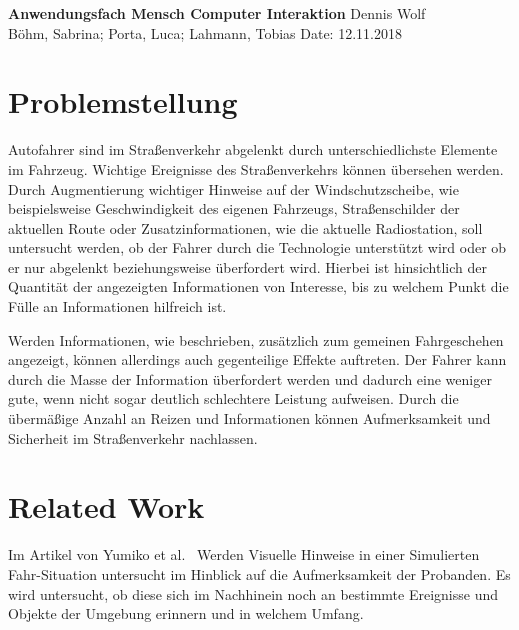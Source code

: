\documentclass[a4paper, 11pt]{article}
\begin{document}
\noindent
\large\textbf{Anwendungsfach Mensch Computer Interaktion} \hfill Dennis Wolf \\
\normalsize Böhm, Sabrina; Porta, Luca; Lahmann, Tobias \hfill Date: 12.11.2018 \\


\section*{Problemstellung}
Autofahrer sind im Straßenverkehr abgelenkt durch unterschiedlichste Elemente im Fahrzeug. Wichtige Ereignisse des Straßenverkehrs können übersehen werden. Durch Augmentierung wichtiger Hinweise auf der Windschutzscheibe, wie beispielsweise Geschwindigkeit des eigenen Fahrzeugs, Straßenschilder der aktuellen Route oder Zusatzinformationen, wie die aktuelle Radiostation, soll untersucht werden, ob der Fahrer durch die Technologie unterstützt wird oder ob er nur abgelenkt beziehungsweise überfordert wird. Hierbei ist hinsichtlich der Quantität der angezeigten Informationen von Interesse, bis zu welchem Punkt die Fülle an Informationen hilfreich ist. 

Werden Informationen, wie beschrieben, zusätzlich zum gemeinen Fahrgeschehen angezeigt, können allerdings auch gegenteilige Effekte auftreten. Der Fahrer kann durch die Masse der Information überfordert werden und dadurch eine weniger gute, wenn nicht sogar deutlich schlechtere Leistung aufweisen. Durch die übermäßige Anzahl an Reizen und Informationen können Aufmerksamkeit und Sicherheit im Straßenverkehr nachlassen. 

\section*{Related Work}
Im Artikel von Yumiko et al.~\cite{VisAttention} Werden Visuelle Hinweise in einer Simulierten Fahr-Situation untersucht im Hinblick auf die Aufmerksamkeit der Probanden. Es wird untersucht, ob diese sich im Nachhinein noch an bestimmte Ereignisse und Objekte der Umgebung erinnern und in welchem Umfang.

\cite{seppelt2017attend, yeh2001cueReliability, chi05bonanni}
\end{document}
